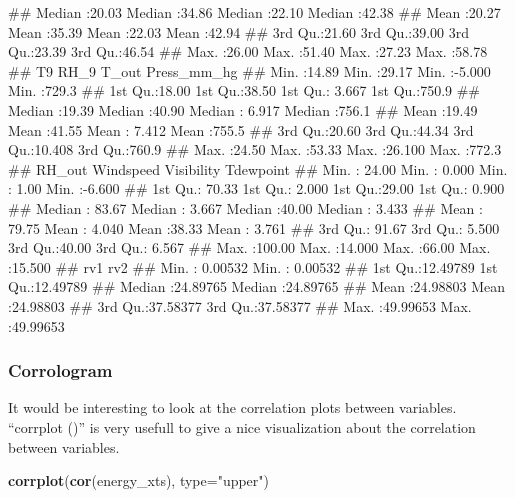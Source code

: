 \documentclass[]{article}
\newenvironment{Shaded}{\begin{snugshade}}{\end{snugshade}}
\newcommand{\KeywordTok}[1]{\textcolor[rgb]{0.13,0.29,0.53}{\textbf{#1}}}
\newcommand{\DataTypeTok}[1]{\textcolor[rgb]{0.13,0.29,0.53}{#1}}
\newcommand{\StringTok}[1]{\textcolor[rgb]{0.31,0.60,0.02}{#1}}
\newcommand{\NormalTok}[1]{#1}
\begin{document}
\begin{Shaded}
\begin{Highlighting}[]
\NormalTok{##  Median :20.03   Median :34.86   Median :22.10   Median :42.38  }
\NormalTok{##  Mean   :20.27   Mean   :35.39   Mean   :22.03   Mean   :42.94  }
\NormalTok{##  3rd Qu.:21.60   3rd Qu.:39.00   3rd Qu.:23.39   3rd Qu.:46.54  }
\NormalTok{##  Max.   :26.00   Max.   :51.40   Max.   :27.23   Max.   :58.78  }
\NormalTok{##        T9             RH_9           T_out         Press_mm_hg   }
\NormalTok{##  Min.   :14.89   Min.   :29.17   Min.   :-5.000   Min.   :729.3  }
\NormalTok{##  1st Qu.:18.00   1st Qu.:38.50   1st Qu.: 3.667   1st Qu.:750.9  }
\NormalTok{##  Median :19.39   Median :40.90   Median : 6.917   Median :756.1  }
\NormalTok{##  Mean   :19.49   Mean   :41.55   Mean   : 7.412   Mean   :755.5  }
\NormalTok{##  3rd Qu.:20.60   3rd Qu.:44.34   3rd Qu.:10.408   3rd Qu.:760.9  }
\NormalTok{##  Max.   :24.50   Max.   :53.33   Max.   :26.100   Max.   :772.3  }
\NormalTok{##      RH_out         Windspeed        Visibility      Tdewpoint     }
\NormalTok{##  Min.   : 24.00   Min.   : 0.000   Min.   : 1.00   Min.   :-6.600  }
\NormalTok{##  1st Qu.: 70.33   1st Qu.: 2.000   1st Qu.:29.00   1st Qu.: 0.900  }
\NormalTok{##  Median : 83.67   Median : 3.667   Median :40.00   Median : 3.433  }
\NormalTok{##  Mean   : 79.75   Mean   : 4.040   Mean   :38.33   Mean   : 3.761  }
\NormalTok{##  3rd Qu.: 91.67   3rd Qu.: 5.500   3rd Qu.:40.00   3rd Qu.: 6.567  }
\NormalTok{##  Max.   :100.00   Max.   :14.000   Max.   :66.00   Max.   :15.500  }
\NormalTok{##       rv1                rv2          }
\NormalTok{##  Min.   : 0.00532   Min.   : 0.00532  }
\NormalTok{##  1st Qu.:12.49789   1st Qu.:12.49789  }
\NormalTok{##  Median :24.89765   Median :24.89765  }
\NormalTok{##  Mean   :24.98803   Mean   :24.98803  }
\NormalTok{##  3rd Qu.:37.58377   3rd Qu.:37.58377  }
\NormalTok{##  Max.   :49.99653   Max.   :49.99653}
\end{Highlighting}
\end{Shaded}

\subsubsection{Corrologram}\label{corrologram}

It would be interesting to look at the correlation plots between
variables. ``corrplot ()'' is very usefull to give a nice visualization
about the correlation between variables.

\begin{Shaded}
\begin{Highlighting}[]
\KeywordTok{corrplot}\NormalTok{(}\KeywordTok{cor}\NormalTok{(energy_xts), }\DataTypeTok{type=}\StringTok{"upper"}\NormalTok{)}
\end{Highlighting}
\end{Shaded}
\end{document}
